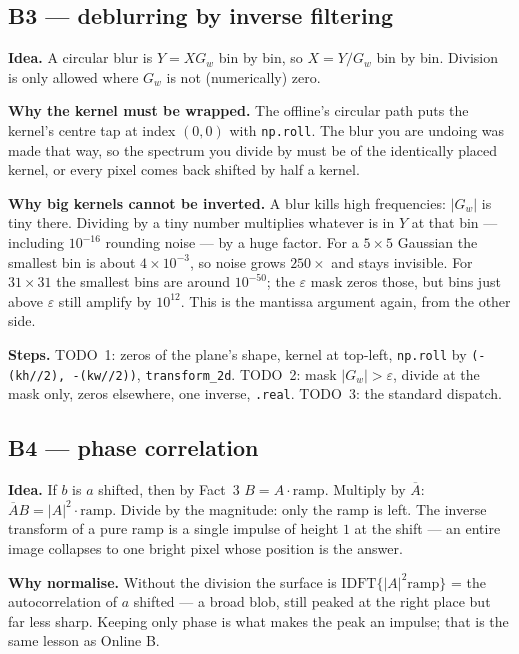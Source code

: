 \documentclass[11pt]{article}
\newcommand{\code}[1]{\texttt{#1}}
\begin{document}
\subsection*{B3 --- deblurring by inverse filtering}

\textbf{Idea.} A circular blur is $Y = X G_w$ bin by bin, so $X = Y / G_w$ bin
by bin. Division is only allowed where $G_w$ is not (numerically) zero.

\textbf{Why the kernel must be wrapped.} The offline's circular path puts the
kernel's centre tap at index $(0,0)$ with \code{np.roll}. The blur you are
undoing was made that way, so the spectrum you divide by must be of the
identically placed kernel, or every pixel comes back shifted by half a kernel.

\textbf{Why big kernels cannot be inverted.} A blur kills high frequencies:
$|G_w|$ is tiny there. Dividing by a tiny number multiplies whatever is in $Y$
at that bin --- including $10^{-16}$ rounding noise --- by a huge factor. For a
$5 \times 5$ Gaussian the smallest bin is about $4 \times 10^{-3}$, so noise
grows $250\times$ and stays invisible. For $31 \times 31$ the smallest bins are
around $10^{-50}$; the $\varepsilon$ mask zeros those, but bins just above
$\varepsilon$ still amplify by $10^{12}$. This is the mantissa argument again,
from the other side.

\textbf{Steps.} TODO~1: zeros of the plane's shape, kernel at top-left,
\code{np.roll} by \code{(-(kh//2), -(kw//2))}, \code{transform\_2d}. TODO~2:
mask $|G_w| > \varepsilon$, divide at the mask only, zeros elsewhere, one
inverse, \code{.real}. TODO~3: the standard dispatch.

\subsection*{B4 --- phase correlation}

\textbf{Idea.} If $b$ is $a$ shifted, then by Fact~3 $B = A \cdot \text{ramp}$.
Multiply by $\overline{A}$: $\overline{A} B = |A|^2 \cdot \text{ramp}$. Divide
by the magnitude: only the ramp is left. The inverse transform of a pure ramp
is a single impulse of height $1$ at the shift --- an entire image collapses to
one bright pixel whose position is the answer.

\textbf{Why normalise.} Without the division the surface is
$\mathrm{IDFT}\{|A|^2 \text{ramp}\}$ = the autocorrelation of $a$ shifted ---
a broad blob, still peaked at the right place but far less sharp. Keeping only
phase is what makes the peak an impulse; that is the same lesson as Online B.
\end{document}
